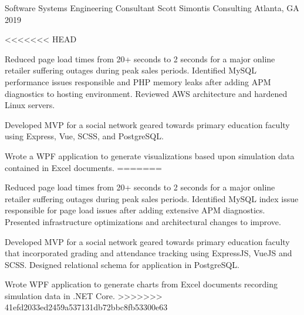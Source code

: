 \begin{cventries}
  \cventry
    {Software Systems Engineering Consultant} %
    {Scott Simontis Consulting} %
    {Atlanta, GA} %
    {2019} %
    {
      \begin{cvitems} %
<<<<<<< HEAD
        \item {Reduced page load times from 20+ seconds to 2 seconds for a major online retailer suffering outages during peak sales periods. Identified MySQL performance issues responsible and PHP memory leaks after adding  APM diagnostics to hosting environment. Reviewed AWS architecture and hardened Linux servers.}
        \item {Developed MVP for a social network geared towards primary education faculty using Express, Vue, SCSS, and PostgreSQL.}
        \item {Wrote a WPF application to generate visualizations based upon simulation data contained in Excel documents.}
=======
        \item {Reduced page load times from 20+ seconds to 2 seconds for a major online retailer suffering outages during peak sales periods. Identified MySQL index issue responsible for page load issues after adding extensive APM diagnostics. Presented infrastructure optimizations and architectural changes to improve.}
        \item {Developed MVP for a social network geared towards primary education faculty that incorporated grading and attendance tracking using ExpressJS, VueJS and SCSS. Designed relational schema for application in PostgreSQL.}
        \item {Wrote WPF application to generate charts from Excel documents recording simulation data in .NET Core.}
>>>>>>> 41efd2033ed2459a537131db72bbc8fb53300e63
      \end{cvitems}
    }


\end{cventries}
